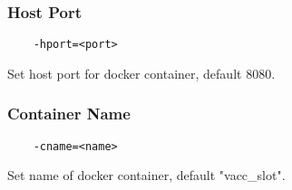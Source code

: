 \subsubsection{Host Port}
\begin{verbatim}
    -hport=<port>
\end{verbatim}
Set host port for docker container, default 8080.

\subsubsection{Container Name}\label{ref:ContainerName}
\begin{verbatim}
    -cname=<name>
\end{verbatim}
Set name of docker container, default "vacc{\_}slot".